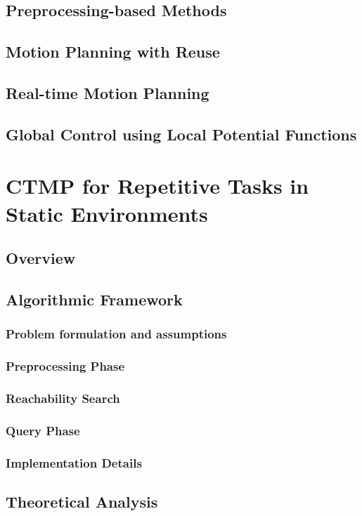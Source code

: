 \documentclass[a4paper,10pt]{article}
\begin{document}
\subsection{Preprocessing-based Methods}
\subsection{Motion Planning with Reuse}
\subsection{Real-time Motion Planning}
\subsection{Global Control using Local Potential Functions}

\section{CTMP for Repetitive Tasks in Static Environments}
\subsection{Overview}
\subsection{Algorithmic Framework}
\subsubsection{Problem formulation and assumptions}
\subsubsection{Preprocessing Phase}
\subsubsection{Reachability Search}
\subsubsection{Query Phase}
\subsubsection{Implementation Details}
\subsection{Theoretical Analysis}
\end{document}
